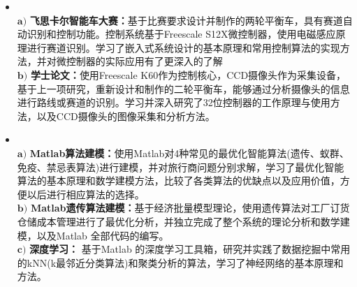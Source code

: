 \documentclass[zh]{resume}
\begin{document}
\begin{itemize}
	\item {}%
	\\
	$\mathbf{a)}$ \textbf{飞思卡尔智能车大赛：}基于比赛要求设计并制作的两轮平衡车，具有赛道自动识别和控制功能。控制系统基于Freescale S12X微控制器，使用电磁感应原理进行赛道识别。学习了嵌入式系统设计的基本原理和常用控制算法的实现方法，并对微控制器的实际应用有了更深入的了解\\
	$\mathbf{b)}$ \textbf{学士论文：}使用Freescale K60作为控制核心，CCD摄像头作为采集设备，基于上一项研究，重新设计和制作的二轮平衡车，能够通过分析摄像头的信息进行路线或赛道的识别。学习并深入研究了32位控制器的工作原理与使用方法，以及CCD摄像头的图像采集和分析方法。
	
	\item 
	\\
	$ \mathbf{a)}  $ \textbf{Matlab算法建模：}使用Matlab对4种常见的最优化智能算法(遗传、蚁群、免疫、禁忌表算法)进行建模，并对旅行商问题分别求解，学习了最优化智能算法的基本原理和数学建模方法，比较了各类算法的优缺点以及应用价值，方便以后进行相应算法的选择。\\
	$ \mathbf{b)}  $ \textbf{Matlab遗传算法建模：}基于经济批量模型理论，使用遗传算法对工厂订货仓储成本管理进行了最优化分析，并独立完成了整个系统的理论分析和数学建模，以及Matlab 全部代码的编写。\\
	$ \mathbf{c)}  $ \textbf{深度学习： }基于Matlab 的深度学习工具箱，研究并实践了数据挖掘中常用的kNN(k最邻近分类算法)和聚类分析的算法，学习了神经网络的基本原理和方法。
	

\end{itemize}
\end{document}
